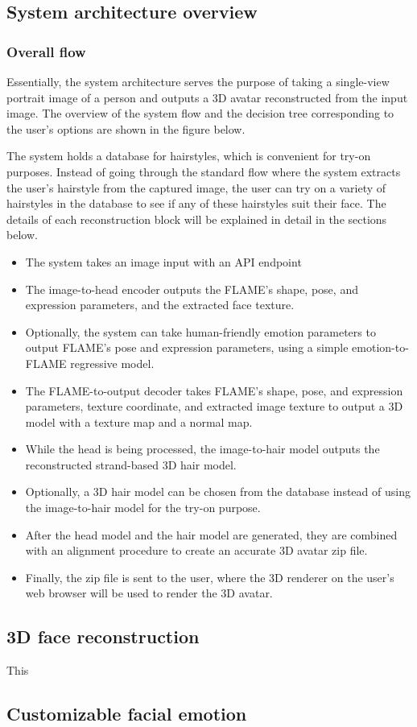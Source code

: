 \subsection{System architecture overview}

\subsubsection{Overall flow}

Essentially, the system architecture serves the purpose of taking a single-view portrait image of a person and outputs a 3D avatar reconstructed from the input image. The overview of the system flow and the decision tree corresponding to the user's options are shown in the figure below.


The system holds a database for hairstyles, which is convenient for try-on purposes. Instead of going through the standard flow where the system extracts the user's hairstyle from the captured image, the user can try on a variety of hairstyles in the database to see if any of these hairstyles suit their face. The details of each reconstruction block will be explained in detail in the sections below.




\begin{itemize}
    \item The system takes an image input with an API endpoint
    \item The image-to-head encoder outputs the FLAME's shape, pose, and expression parameters, and the extracted face texture.
    \item Optionally, the system can take human-friendly emotion parameters to output FLAME's pose and expression parameters, using a simple emotion-to-FLAME regressive model.
    \item The FLAME-to-output decoder takes FLAME's shape, pose, and expression parameters, texture coordinate, and extracted image texture to output a 3D model with a texture map and a normal map.
    \item While the head is being processed, the image-to-hair model outputs the reconstructed strand-based 3D hair model.
    \item Optionally, a 3D hair model can be chosen from the database instead of using the image-to-hair model for the try-on purpose.
    \item After the head model and the hair model are generated, they are combined with an alignment procedure to create an accurate 3D avatar zip file.
    \item Finally, the zip file is sent to the user, where the 3D renderer on the user's web browser will be used to render the 3D avatar.
\end{itemize}


\subsection{3D face reconstruction}
This 

\subsection{Customizable facial emotion}

